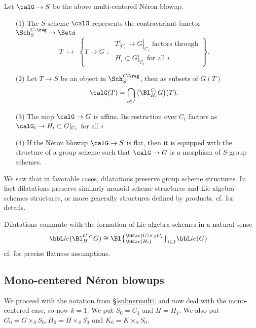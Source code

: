 \documentclass[10pt]{alggeom}
\theoremstyle{definition}
\numberwithin{equation}{section}
\begin{document}
 \label{Neron.blow.lemm} 
Let $\calG\to S$ be the above multi-centered N\'eron blowup.
\begin{enumerate}
\item[(1)]   The $S$-scheme $\calG$ represents the contravariant functor
$\Sch_S^{C\text{-}\reg}\to  \Sets$ 
\[
T \,\,\longmapsto\,\,\left\{T\to G\,\,:\,\,\begin{array}{c}\text{$T|_{C_i}\to G|_{C_i}$ factors through} \\ \text{$H_i\subset G|_{C_i}$ for all $i$}\end{array}\right\}.
\]


\item[(2)] Let $T \to S$ be an object in $\Sch_S^{C\text{-}\reg}$, then as subsets of $G(T)$ \[ \calG (T) = \bigcap_{i \in I} \big( \Bl_{H_i}^{C_i}G \big)(T).\]


\item[(3)] The map $\calG\to G$ is affine. 
Its restriction over $C_i$ factors as $\calG_i\to H_i \subset  G|_{C_i}$ for all $i$

\item[(4)] If the N\'eron blowup $\calG\to S$ is flat, then it is equipped with the structure of a group scheme such that $\calG\to G$ is a morphism of $S$-group schemes.
\end{enumerate}
\xprop 

\rema We saw that in favorable cases, dilatations preserve group scheme structures. In fact dilatations preserve similarly monoid scheme structures and Lie algebra schemes structures, or more generally structures defined by products, cf. \cite[§7]{Ma23d} for details.
\xrema 

\rema Dilatations commute with the formation of Lie algebra schemes in a natural sense \[ \bbL ie (\Bl_H^{G|_C}G ) \cong \Bl \big\{{}^{\bbL ie (G) \times _S C_i}_{\bbL ie ( H_i )} \big\}_{i \in I} \bbL ie (G) \] cf. \cite[§7]{Ma23d} for precise flatness assumptions.
\xrema 
 
 
 \subsection{Mono-centered Néron blowups}
 We proceed with the notation from §\ref{subnermulti} and now deal with the mono-centered case, so now $k=1$. We put $S_0= C_1$ and $H=H_1$. We also put $G_0= G \times _S S_0, H_0= H \times _S S_0$ and $K_0= K \times _S S_0$. 
 
\end{document}
